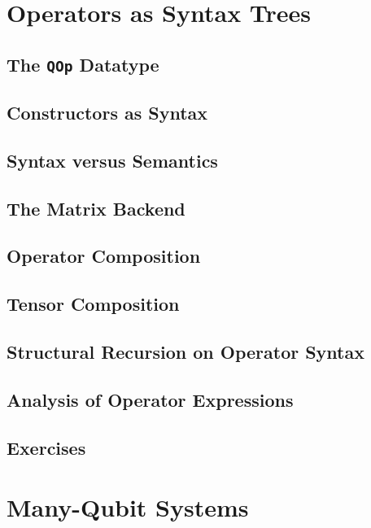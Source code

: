 \documentclass[11pt,a4paper]{article}
\begin{document}
\section{Operators as Syntax Trees}

\subsection{The \texttt{QOp} Datatype}

\subsection{Constructors as Syntax}

\subsection{Syntax versus Semantics}

\subsection{The Matrix Backend}

\subsection{Operator Composition}

\subsection{Tensor Composition}

\subsection{Structural Recursion on Operator Syntax}

\subsection{Analysis of Operator Expressions}

\subsection{Exercises}


\section{Many-Qubit Systems}
\end{document}
